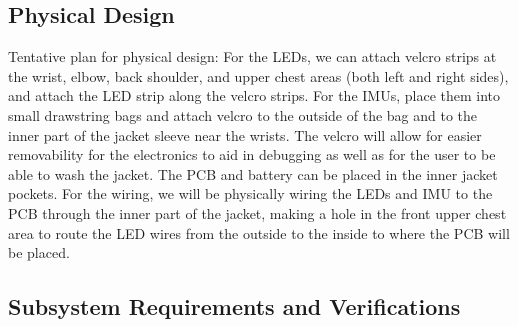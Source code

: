 \documentclass[12pt]{article}
\begin{document}
\subsection{Physical Design}
Tentative plan for physical design: For the LEDs, we can attach velcro strips at the wrist, elbow, back shoulder, and upper chest areas (both left and right sides), and attach the LED strip along the velcro strips. For the IMUs, place them into small drawstring bags and attach velcro to the outside of the bag and to the inner part of the jacket sleeve near the wrists. The velcro will allow for easier removability for the electronics to aid in debugging as well as for the user to be able to wash the jacket. The PCB and battery can be placed in the inner jacket pockets. For the wiring, we will be physically wiring the LEDs and IMU to the PCB through the inner part of the jacket, making a hole in the front upper chest area to route the LED wires from the outside to the inside to where the PCB will be placed. 
\subsection{Subsystem Requirements and Verifications}
\end{document}
